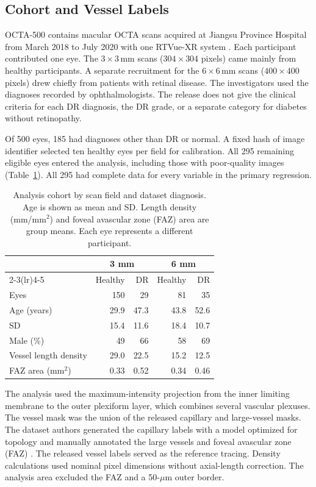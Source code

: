 \documentclass[letterpaper]{article}
\begin{document}
\subsection{Cohort and Vessel Labels}
OCTA-500 contains macular OCTA scans acquired at Jiangsu Province Hospital from March 2018 to July 2020 with one RTVue-XR system \citep{li2024octa500}. Each participant contributed one eye. The $3\times3$\,mm scans ($304\times304$ pixels) came mainly from healthy participants. A separate recruitment for the $6\times6$\,mm scans ($400\times400$ pixels) drew chiefly from patients with retinal disease. The investigators used the diagnoses recorded by ophthalmologists. The release does not give the clinical criteria for each DR diagnosis, the DR grade, or a separate category for diabetes without retinopathy.

Of 500 eyes, 185 had diagnoses other than DR or normal. A fixed hash of image identifier selected ten healthy eyes per field for calibration. All 295 remaining eligible eyes entered the analysis, including those with poor-quality images (Table~\ref{tab:cohort}). All 295 had complete data for every variable in the primary regression.

\begin{table}[t]
\centering
\small
\begin{tabular}{lrrrr}
\toprule
 & \multicolumn{2}{c}{3 mm} & \multicolumn{2}{c}{6 mm}\\
\cmidrule(lr){2-3}\cmidrule(lr){4-5}
 & Healthy & DR & Healthy & DR\\
\midrule
Eyes & 150 & 29 & 81 & 35\\
Age (years) & 29.9 & 47.3 & 43.8 & 52.6\\
\quad SD & 15.4 & 11.6 & 18.4 & 10.7\\
Male (\%) & 49 & 66 & 58 & 69\\
Vessel length density & 29.0 & 22.5 & 15.2 & 12.5\\
FAZ area (mm$^2$) & 0.33 & 0.52 & 0.34 & 0.46\\
\bottomrule
\end{tabular}
\caption{Analysis cohort by scan field and dataset diagnosis. Age is shown as mean and SD. Length density (mm/mm$^2$) and foveal avascular zone (FAZ) area are group means. Each eye represents a different participant.}
\label{tab:cohort}
\end{table}

The analysis used the maximum-intensity projection from the inner limiting membrane to the outer plexiform layer, which combines several vascular plexuses. The vessel mask was the union of the released capillary and large-vessel masks. The dataset authors generated the capillary labels with a model optimized for topology and manually annotated the large vessels and foveal avascular zone (FAZ) \citep{li2024octa500}. The released vessel labels served as the reference tracing. Density calculations used nominal pixel dimensions without axial-length correction. The analysis area excluded the FAZ and a 50-$\mu$m outer border.
\end{document}
